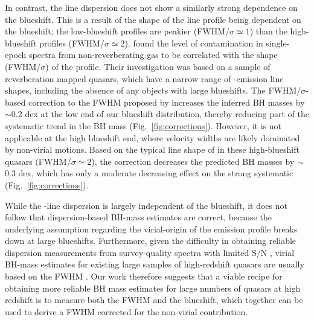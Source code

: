In contrast, the  line dispersion does not show a similarly strong dependence on the blueshift. 
This is a result of the shape of the  line profile being dependent on the blueshift; the low-blueshift profiles are peakier (FWHM/$\sigma \simeq 1$) than the high-blueshift profiles (FWHM/$\sigma \simeq 2$). 
\citet{denney12} found the level of contamination in single-epoch spectra from non-reverberating gas to be correlated with the shape (FWHM/$\sigma$) of the  profile. 
Their investigation was based on a sample of reverberation mapped quasars, which have a narrow range of -emission line shapes, including the absence of any objects with large  blueshifts. 
The FWHM/$\sigma$-based correction to the  FWHM proposed by \citet{denney12} increases the inferred BH masses by $\sim$0.2 dex at the low end of our  blueshift distribution, thereby reducing part of the systematic trend in the BH mass (Fig.~\ref{fig:corrections}).  
However, it is not applicable at the high  blueshift end, where velocity widths are likely dominated by non-virial motions.
Based on the typical line shape of  in these high-blueshift quasars (FWHM/$\sigma \simeq 2$), the \citet{denney12} correction decreases the predicted BH masses by $\sim$0.3 dex, which has only a moderate decreasing effect on the strong systematic (Fig.~\ref{fig:corrections}).  

While the -line dispersion is largely independent of the blueshift, it does not follow that dispersion-based BH-mass estimates are correct, because the underlying assumption regarding the virial-origin of the  emission profile breaks down at large blueshifts.
Furthermore, given the difficulty in obtaining reliable dispersion measurements from survey-quality spectra with limited S/N \citep[e.g.][]{mejia-restrepo16}, virial BH-mass estimates for existing large samples of high-redshift quasars are usually based on the FWHM \citep[e.g.][]{shen11}. 
Our work therefore suggests that a viable recipe for obtaining more reliable BH mass estimates for large numbers of quasars at high redshift is to measure both the FWHM and the blueshift, which together can be used to derive a FWHM corrected for the non-virial contribution. 

